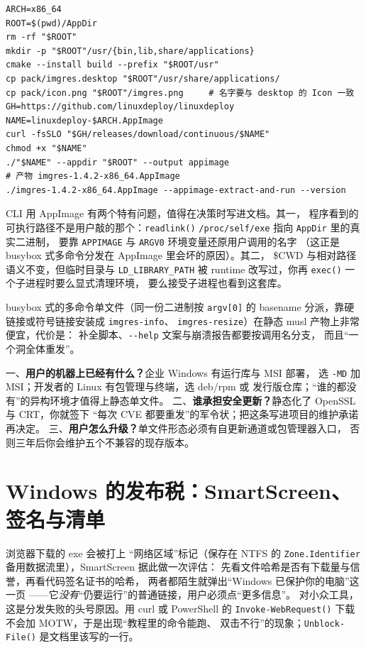 \documentclass[12pt,a4paper,fontset=fandol]{ctexbook}
\newcommand{\Fn}[1]{\texttt{#1()}}
\newcommand{\Tp}[1]{\texttt{#1}}
\newcommand{\Opt}[1]{\texttt{-\/-#1}}
\newcommand{\Short}[1]{\texttt{-#1}}
\begin{document}
\begin{lstlisting}[style=shellstyle,caption={从 install 目录做一个 AppImage}]
ARCH=x86_64
ROOT=$(pwd)/AppDir
rm -rf "$ROOT"
mkdir -p "$ROOT"/usr/{bin,lib,share/applications}
cmake --install build --prefix "$ROOT/usr"
cp pack/imgres.desktop "$ROOT"/usr/share/applications/
cp pack/icon.png "$ROOT"/imgres.png     # 名字要与 desktop 的 Icon 一致
GH=https://github.com/linuxdeploy/linuxdeploy
NAME=linuxdeploy-$ARCH.AppImage
curl -fsSLO "$GH/releases/download/continuous/$NAME"
chmod +x "$NAME"
./"$NAME" --appdir "$ROOT" --output appimage
# 产物 imgres-1.4.2-x86_64.AppImage
./imgres-1.4.2-x86_64.AppImage --appimage-extract-and-run --version
\end{lstlisting}

CLI 用 AppImage 有两个特有问题，值得在决策时写进文档。其一，
程序看到的可执行路径不是用户敲的那个：\Fn{readlink}
\Tp{/proc/self/exe} 指向 \Tp{AppDir} 里的真实二进制，
要靠 \Tp{APPIMAGE} 与 \Tp{ARGV0} 环境变量还原用户调用的名字
（这正是 busybox 式多命令分发在 AppImage 里会坏的原因）。其二，
\$CWD 与相对路径语义不变，但临时目录与 \Tp{LD\_LIBRARY\_PATH}
被 runtime 改写过，你再 \Fn{exec} 一个子进程时要么显式清理环境，
要么接受子进程也看到这套库。

busybox 式的多命令单文件（同一份二进制按 \Tp{argv[0]} 的 basename
分派，靠硬链接或符号链接安装成 \Tp{imgres-info}、
\Tp{imgres-resize}）在静态 musl 产物上非常便宜，代价是：
补全脚本、\Opt{help} 文案与崩溃报告都要按调用名分支，
而且``一个洞全体重发''。

\begin{guideline}[title={分发形态的决策三问}]
一、\textbf{用户的机器上已经有什么？}企业 Windows 有运行库与 MSI 部署，
选 \Short{MD} 加 MSI；开发者的 Linux 有包管理与终端，选 deb/rpm 或
发行版仓库；``谁的都没有''的异构环境才值得上静态单文件。
二、\textbf{谁承担安全更新？}静态化了 OpenSSL 与 CRT，你就签下
``每次 CVE 都要重发''的军令状；把这条写进项目的维护承诺再决定。
三、\textbf{用户怎么升级？}单文件形态必须有自更新通道或包管理器入口，
否则三年后你会维护五个不兼容的现存版本。
\end{guideline}

\section{Windows 的发布税：SmartScreen、签名与清单}

浏览器下载的 exe 会被打上 ``网络区域''标记（保存在 NTFS 的
\Tp{Zone.Identifier} 备用数据流里），SmartScreen 据此做一次评估：
先看文件哈希是否有下载量与信誉，再看代码签名证书的哈希，
两者都陌生就弹出``Windows 已保护你的电脑''这一页
——它\emph{没有}``仍要运行''的普通链接，用户必须点``更多信息''。
对小众工具，这是分发失败的头号原因。用 curl 或 PowerShell 的
\Fn{Invoke-WebRequest} 下载不会加 MOTW，于是出现``教程里的命令能跑、
双击不行''的现象；\Fn{Unblock-File} 是文档里该写的一行。
\end{document}
